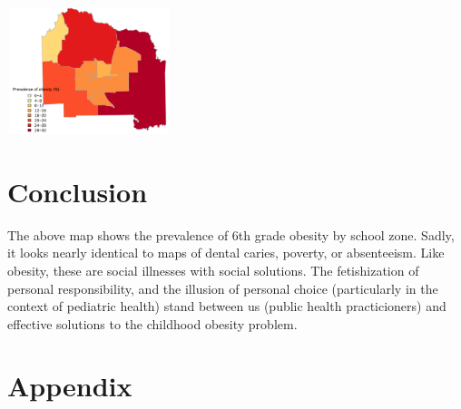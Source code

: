 \begin{multicols}{2}
\includegraphics[height=140, width=180]{alachua3.png}


\section*{Conclusion}
The above map shows the prevalence of 6th grade obesity by school zone.  Sadly, it looks nearly identical to maps of dental caries, poverty, or absenteeism.  Like obesity, these are social illnesses with social solutions. The fetishization of personal responsibility, and the illusion of personal choice (particularly in the context of pediatric health) stand between us (public health practicioners) and effective solutions to the childhood obesity problem.  




\newpage




\end{multicols}

\clearpage
\section{Appendix}
